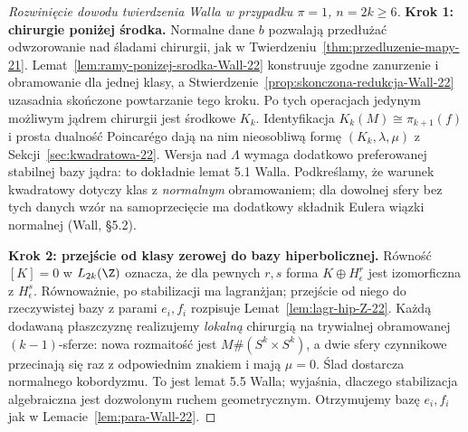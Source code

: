 \begin{proof}[Rozwinięcie dowodu twierdzenia Walla w przypadku
 $\pi=1$, $n=2k\geq6$]
\textbf{Krok 1: chirurgie poniżej środka.}
Normalne dane $b$ pozwalają przedłużać
odwzorowanie nad śladami chirurgii, jak w
Twierdzeniu~\ref{thm:przedluzenie-mapy-21}.
Lemat~\ref{lem:ramy-ponizej-srodka-Wall-22}
konstruuje zgodne zanurzenie i obramowanie
dla jednej klasy, a
Stwierdzenie~\ref{prop:skonczona-redukcja-Wall-22}
uzasadnia skończone powtarzanie tego kroku.
Po tych operacjach jedynym możliwym
jądrem chirurgii jest środkowe $K_k$.
Identyfikacja $K_k(M)\cong\pi_{k+1}(f)$
i prosta dualność Poincarégo dają
na nim nieosobliwą formę
$(K_k,\lambda,\mu)$ z
Sekcji~\ref{sec:kwadratowa-22}.
Wersja nad $\Lambda$ wymaga dodatkowo
preferowanej stabilnej bazy jądra:
to dokładnie lemat 5.1 Walla.
Podkreślamy, że warunek kwadratowy dotyczy
klas z \emph{normalnym} obramowaniem;
dla dowolnej sfery bez tych danych wzór
na samoprzecięcie ma dodatkowy składnik
Eulera wiązki normalnej (Wall, §5.2).

\textbf{Krok 2: przejście od klasy zerowej do
bazy hiperbolicznej.}
Równość $[K]=0$ w $L_{2k}(\Z)$
oznacza, że dla pewnych $r,s$
forma $K\oplus H_\epsilon^r$ jest
izomorficzna z $H_\epsilon^s$.
Równoważnie, po stabilizacji ma
lagranżjan; przejście od niego do
rzeczywistej bazy z parami $e_i,f_i$
rozpisuje Lemat~\ref{lem:lagr-hip-Z-22}.
Każdą dodawaną
płaszczyznę realizujemy \emph{lokalną}
chirurgią na trywialnej obramowanej
$(k-1)$-sferze: nowa rozmaitość jest
$M\#(S^k\times S^k)$, a dwie sfery
czynnikowe przecinają się raz z
odpowiednim znakiem i mają $\mu=0$.
Ślad dostarcza normalnego kobordyzmu.
To jest lemat 5.5 Walla; wyjaśnia, dlaczego
stabilizacja algebraiczna jest dozwolonym
ruchem geometrycznym. Otrzymujemy bazę
$e_i,f_i$ jak w Lemacie~\ref{lem:para-Wall-22}.


\end{proof}
